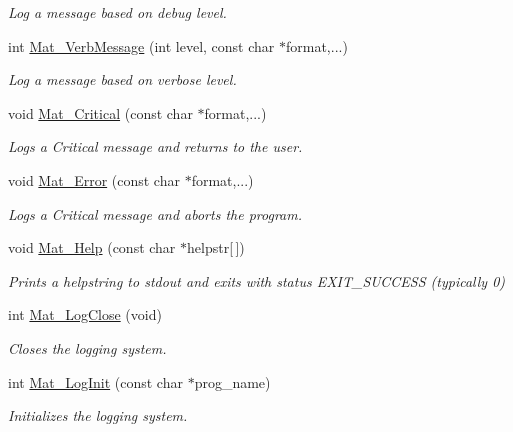 \begin{DoxyCompactItemize}
\begin{DoxyCompactList}\small\item\em Log a message based on debug level. \end{DoxyCompactList}\item 
int \hyperlink{group__mat__util_ga64a176ea7e27e38d4242a24f3e3bad24}{Mat\+\_\+\+Verb\+Message} (int level, const char $\ast$format,...)
\begin{DoxyCompactList}\small\item\em Log a message based on verbose level. \end{DoxyCompactList}\item 
void \hyperlink{group__mat__util_gaf51f2bfbb5580f575e4dd79757e2b80c}{Mat\+\_\+\+Critical} (const char $\ast$format,...)
\begin{DoxyCompactList}\small\item\em Logs a Critical message and returns to the user. \end{DoxyCompactList}\item 
void \hyperlink{group__mat__util_ga058b1cb9a4ca36712857d2b3c4de7ffc}{Mat\+\_\+\+Error} (const char $\ast$format,...)
\begin{DoxyCompactList}\small\item\em Logs a Critical message and aborts the program. \end{DoxyCompactList}\item 
void \hyperlink{group__mat__util_gaa4039c185e807ed2e9682b66fe2ea331}{Mat\+\_\+\+Help} (const char $\ast$helpstr\mbox{[}$\,$\mbox{]})
\begin{DoxyCompactList}\small\item\em Prints a helpstring to stdout and exits with status E\+X\+I\+T\+\_\+\+S\+U\+C\+C\+E\+SS (typically 0) \end{DoxyCompactList}\item 
int \hyperlink{group__mat__util_ga333d15dbd2e7a691621a2af8fc7adc3d}{Mat\+\_\+\+Log\+Close} (void)
\begin{DoxyCompactList}\small\item\em Closes the logging system. \end{DoxyCompactList}\item 
int \hyperlink{group__mat__util_ga0d30e03216ceaab7c0a4ff878b26f89f}{Mat\+\_\+\+Log\+Init} (const char $\ast$prog\+\_\+name)
\begin{DoxyCompactList}\small\item\em Initializes the logging system. \end{DoxyCompactList}\item 

\end{DoxyCompactItemize}

